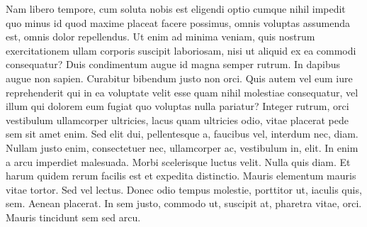 Nam libero tempore, cum soluta nobis est eligendi optio cumque nihil impedit quo minus id quod maxime placeat facere possimus, omnis voluptas assumenda est, omnis dolor repellendus. Ut enim ad minima veniam, quis nostrum exercitationem ullam corporis suscipit laboriosam, nisi ut aliquid ex ea commodi consequatur? Duis condimentum augue id magna semper rutrum. In dapibus augue non sapien. Curabitur bibendum justo non orci. Quis autem vel eum iure reprehenderit qui in ea voluptate velit esse quam nihil molestiae consequatur, vel illum qui dolorem eum fugiat quo voluptas nulla pariatur? Integer rutrum, orci vestibulum ullamcorper ultricies, lacus quam ultricies odio, vitae placerat pede sem sit amet enim. Sed elit dui, pellentesque a, faucibus vel, interdum nec, diam. Nullam justo enim, consectetuer nec, ullamcorper ac, vestibulum in, elit. In enim a arcu imperdiet malesuada. Morbi scelerisque luctus velit. Nulla quis diam. Et harum quidem rerum facilis est et expedita distinctio. Mauris elementum mauris vitae tortor. Sed vel lectus. Donec odio tempus molestie, porttitor ut, iaculis quis, sem. Aenean placerat. In sem justo, commodo ut, suscipit at, pharetra vitae, orci. Mauris tincidunt sem sed arcu.\endinput